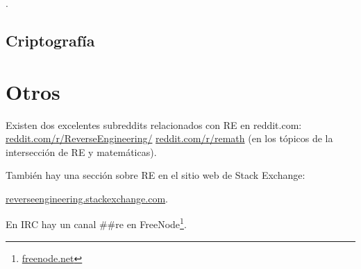\JavaBook.

\section{Criptograf\'ia}



\chapter{Otros}

Existen dos excelentes subreddits relacionados con \ac{RE} en reddit.com:
\href{http://go.yurichev.com/17027}{reddit.com/r/ReverseEngineering/} \ESph{}
\href{http://go.yurichev.com/17028}{reddit.com/r/remath}
(en los t\'opicos de la intersecci\'on de \ac{RE} y matem\'aticas).

Tambi\'en hay una secci\'on sobre \ac{RE} en el sitio web de Stack Exchange:

\par
\href{http://go.yurichev.com/17029}{reverseengineering.stackexchange.com}.

En IRC hay un canal \#\#re en
FreeNode\footnote{\href{http://go.yurichev.com/17030}{freenode.net}}.

